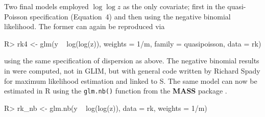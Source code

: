 \documentclass[10pt,a4paper,twoside]{article}
\let\code=\texttt
\let\pkg=\textbf
\let\proglang=\textsf
\newenvironment{Schunk}{}{}
\begin{document}
Two final models employed $\log \log z$ as the only covariate; 
first in the quasi-Poisson specification (Equation~4) and then using the negative binomial
likelihood. The former can again be reproduced via
%
\begin{Schunk}
\begin{Sinput}
R> rk4 <- glm(y ~ log(log(z)), weights = 1/m, family = quasipoisson, data = rk)
\end{Sinput}
\end{Schunk}
%
using the same specification of dispersion as above. 
The negative binomial results in \cite{repro:Koenker:1988} were computed, not
in \proglang{GLIM}, but with general code written by Richard Spady for maximum
likelihood estimation and linked to \proglang{S}. The same model can now
be estimated in \proglang{R} using the \code{glm.nb()} function from the 
\pkg{MASS} package \citep{repro:Venables+Ripley:2002}.
%
\begin{Schunk}
\begin{Sinput}
R> rk_nb <- glm.nb(y ~ log(log(z)), data = rk, weights = 1/m)
\end{Sinput}
\end{Schunk}
%
%
%
\end{document}

